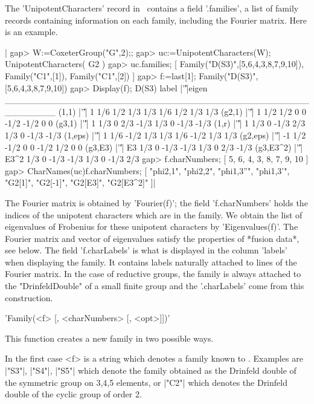 The  'UnipotentCharacters' record in \CHEVIE\ contains a field '.families',
a  list of family records containing  information on each family, including
the Fourier matrix. Here is an example.

|    gap> W:=CoxeterGroup("G",2);;
    gap> uc:=UnipotentCharacters(W);
    UnipotentCharacters( G2 )
    gap> uc.families;
    [ Family("D(S3)",[5,6,4,3,8,7,9,10]), Family("C1",[1]),
      Family("C1",[2]) ]
    gap> f:=last[1];
    Family("D(S3)",[5,6,4,3,8,7,9,10])
    gap> Display(f);
    D(S3)
        label |'\|'|eigen
    ________________________________________________________
    (1,1)     |'\|'|    1 1/6  1/2  1/3  1/3  1/6  1/2  1/3  1/3
    (g2,1)    |'\|'|    1 1/2  1/2    0    0 -1/2 -1/2    0    0
    (g3,1)    |'\|'|    1 1/3    0  2/3 -1/3  1/3    0 -1/3 -1/3
    (1,r)     |'\|'|    1 1/3    0 -1/3  2/3  1/3    0 -1/3 -1/3
    (1,eps)   |'\|'|    1 1/6 -1/2  1/3  1/3  1/6 -1/2  1/3  1/3
    (g2,eps)  |'\|'|   -1 1/2 -1/2    0    0 -1/2  1/2    0    0
    (g3,E3)   |'\|'|   E3 1/3    0 -1/3 -1/3  1/3    0  2/3 -1/3
    (g3,E3^2) |'\|'| E3^2 1/3    0 -1/3 -1/3  1/3    0 -1/3  2/3
    gap> f.charNumbers;
    [ 5, 6, 4, 3, 8, 7, 9, 10 ]
    gap> CharNames(uc){f.charNumbers};
    [ "phi{2,1}", "phi{2,2}", "phi{1,3}''", "phi{1,3}'", "G2[1]",
      "G2[-1]", "G2[E3]", "G2[E3^2]" ]|

The  Fourier matrix is obtained  by 'Fourier(f)'; the field 'f.charNumbers'
holds  the indices of the unipotent characters  which are in the family. We
obtain  the list of eigenvalues of Frobenius for these unipotent characters
by  'Eigenvalues(f)'. The Fourier matrix  and vector of eigenvalues satisfy
the  properties of  *fusion data*,  see below.  The field 'f.charLabels' is
what  is displayed  in the  column 'labels'  when displaying the family. It
contains  labels naturally attached to lines  of the Fourier matrix. In the
case   of  reductive  groups,   the  family  is   always  attached  to  the
"DrinfeldDouble"  of a small  finite group and  the '.charLabels' come from
this construction.

'Family(<f> [, <charNumbers> [, <opt>]])'

This function creates a new family in two possible ways.

In  the first case <f> is a string which denotes a family known to \CHEVIE.
Examples are |"S3"|, |"S4"|, |"S5"| which denote the family obtained as the
Drinfeld  double of the symmetric group  on 3,4,5 elements, or |"C2"| which
denotes the Drinfeld double of the cyclic group of order 2.

